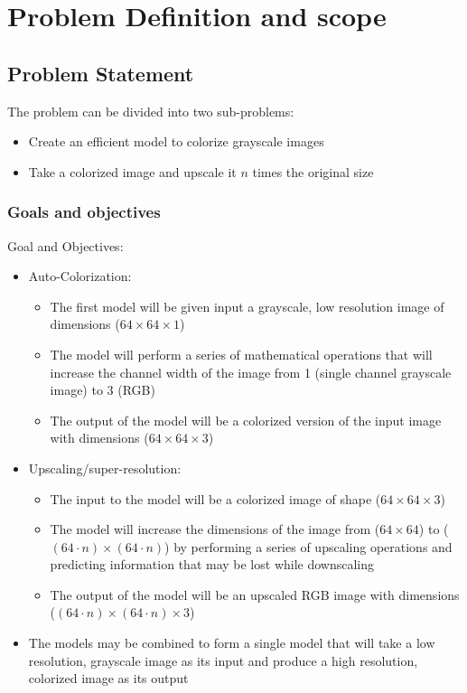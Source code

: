 \documentclass[oneside,a4paper,12pt]{report}
\begin{document}
\chapter{Problem Definition and scope}
\section{Problem Statement}
The problem can be divided into two sub-problems:
\begin{itemize}
	\item Create an efficient model to colorize grayscale images
	\item Take a colorized image and upscale it $n$ times the original size
\end{itemize}


\subsection{Goals and objectives}
Goal and Objectives:
\begin{itemize}
\item Auto-Colorization:
	\begin{itemize}
		\item The first model will be given input a grayscale, low resolution image of dimensions ($64\times 64\times 1$)
  		\item The model will perform a series of mathematical operations that will increase the channel width of the image from 1 (single channel grayscale image) to 3 (RGB)
  		\item The output of the model will be a colorized version of the input image with dimensions ($64\times 64\times 3$)
	\end{itemize}
\item Upscaling/super-resolution:
  	\begin{itemize}
  		\item The input to the model will be a colorized image of shape ($64\times 64\times 3$)
  		\item The model will increase the dimensions of the image from ($64\times 64$) to ($(64\cdot n)\times (64\cdot n)$) by performing a series of upscaling operations and predicting information that may be lost while downscaling
  		\item The output of the model will be an upscaled RGB image with dimensions ($(64\cdot n)\times (64\cdot n)\times 3$)
  	\end{itemize}
  	\item The models may be combined to form a single model that will take a low resolution, grayscale image as its input and produce a high resolution, colorized image as its output
\end{itemize}
\end{document}
